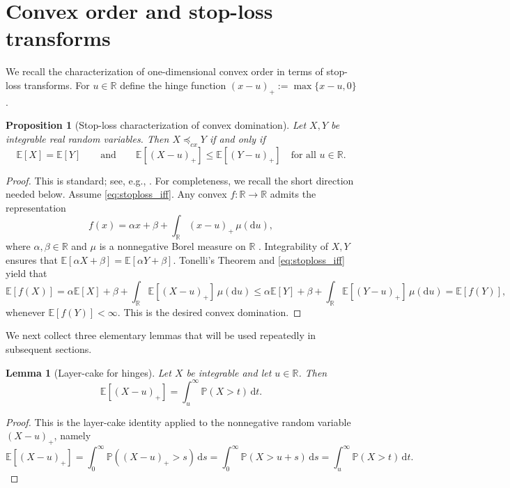 \documentclass[11pt]{article}
\newcommand{\R}{\mathbb{R}}
\newcommand{\Pbb}{\mathbb{P}}
\newcommand{\Ebb}{\mathbb{E}}
\newtheorem{lemma}[theorem]{Lemma}
\newtheorem{proposition}[theorem]{Proposition}
\begin{document}
\section{Convex order and stop-loss transforms}

We recall the characterization of one-dimensional convex order in terms of stop-loss transforms. For $u\in\R$ define the hinge function $(x-u)_+ := \max \{ x - u, 0\}$.

\begin{proposition}[Stop-loss characterization of convex domination]
\label{prop:stoploss_to_convex}
Let $X,Y$ be integrable real random variables. Then $X \preceq_{cx} Y$ if and only if
%
\begin{equation}
\label{eq:stoploss_iff}
\Ebb[X] = \Ebb[Y]
\qquad\text{and}\qquad
\Ebb[(X-u)_+] \le \Ebb[(Y-u)_+]\quad\text{for all }u\in\R.
\end{equation}
%
\end{proposition}

\begin{proof}
This is standard; see, e.g., \cite[Thm.~3.A.1]{ShakedShanthikumar}. For completeness, we recall the short direction needed below.
Assume \eqref{eq:stoploss_iff}.  Any convex $f : \R \to \R$ admits the representation
%
\begin{equation}
\label{eq:hinge_representation}
f(x) = \alpha x + \beta + \int_{\R} (x-u)_+ \, \mu(\mathrm{d}u),
\end{equation}
%
where $\alpha, \beta \in \R$ and $\mu$ is a nonnegative Borel measure on $\R$
\cite[Prop.~3.A.4]{ShakedShanthikumar}.
Integrability of $X,Y$ ensures that $\Ebb [ \alpha X + \beta ] = \Ebb [ \alpha  Y + \beta ]$. Tonelli's Theorem and \eqref{eq:stoploss_iff} yield that
%
\[
\Ebb[f(X)]
= \alpha \Ebb[X] + \beta + \int_{\R} \Ebb [ (X - u)_+ ] \, \mu (\mathrm{d}u)
\le \alpha\Ebb[Y]+\beta+\int_{\R}\Ebb[(Y-u)_+]\,\mu( \mathrm{d}u)
= \Ebb[f(Y)],
\]
%
whenever $\Ebb [ f(Y) ]<\infty$.  This is the desired convex domination.
\end{proof}

We next collect three elementary lemmas that will be used repeatedly in subsequent sections.

\begin{lemma}[Layer-cake for hinges]
\label{lem:layercake}
Let $X$ be integrable and let $u \in \R$. Then
%
\[
\Ebb [ (X - u)_+] = \int_u^\infty \Pbb (X > t) \, \mathrm{d}t.
\]
%
\end{lemma}

\begin{proof}
This is the layer-cake identity applied to the nonnegative random variable $(X - u)_+$, namely
%
\[
\Ebb[(X-u)_+] = \int_0^\infty \Pbb((X - u)_+ > s) \, \mathrm{d}s = \int_0^\infty \Pbb(X > u + s)\, \mathrm{d}s = \int_u^\infty \Pbb(X > t)\, \mathrm{d}t.
\]
%
\end{proof}
\end{document}
